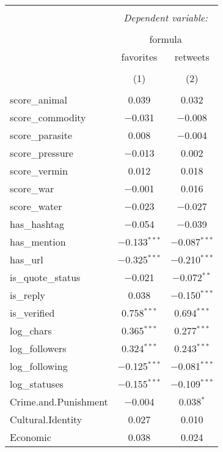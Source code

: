 
\begin{table}[!htbp] \centering 
  \caption{} 
  \label{} 
\begin{tabular}{@{\extracolsep{5pt}}lcc} 
\\[-1.8ex]\hline 
\hline \\[-1.8ex] 
 & \multicolumn{2}{c}{\textit{Dependent variable:}} \\ 
\cline{2-3} 
\\[-1.8ex] & \multicolumn{2}{c}{formula} \\ 
 & favorites & retweets \\ 
\\[-1.8ex] & (1) & (2)\\ 
\hline \\[-1.8ex] 
 score\_animal & 0.039 & 0.032 \\ 
  score\_commodity & $-$0.031 & $-$0.008 \\ 
  score\_parasite & 0.008 & $-$0.004 \\ 
  score\_pressure & $-$0.013 & 0.002 \\ 
  score\_vermin & 0.012 & 0.018 \\ 
  score\_war & $-$0.001 & 0.016 \\ 
  score\_water & $-$0.023 & $-$0.027 \\ 
  has\_hashtag & $-$0.054 & $-$0.039 \\ 
  has\_mention & $-$0.133$^{***}$ & $-$0.087$^{***}$ \\ 
  has\_url & $-$0.325$^{***}$ & $-$0.210$^{***}$ \\ 
  is\_quote\_status & $-$0.021 & $-$0.072$^{**}$ \\ 
  is\_reply & 0.038 & $-$0.150$^{***}$ \\ 
  is\_verified & 0.758$^{***}$ & 0.694$^{***}$ \\ 
  log\_chars & 0.365$^{***}$ & 0.277$^{***}$ \\ 
  log\_followers & 0.324$^{***}$ & 0.243$^{***}$ \\ 
  log\_following & $-$0.125$^{***}$ & $-$0.081$^{***}$ \\ 
  log\_statuses & $-$0.155$^{***}$ & $-$0.109$^{***}$ \\ 
  Crime.and.Punishment & $-$0.004 & 0.038$^{*}$ \\ 
  Cultural.Identity & 0.027 & 0.010 \\ 
  Economic & 0.038 & 0.024 \\ 

\end{tabular}
\end{table}

